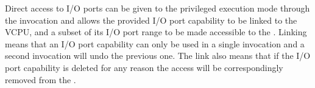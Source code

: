 Direct access to I/O ports can be given to the privileged execution mode through the
 invocation and allows the provided I/O port capability to be
linked to the VCPU, and a subset of its I/O port range to be made accessible to the .
Linking means that an I/O port capability can only be used in a single 
invocation and a second invocation will undo the previous one. The link also means that
if the I/O port capability is deleted for any reason the access will be correspondingly removed
from the .
